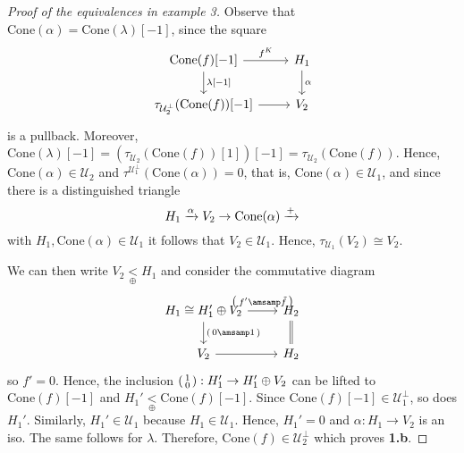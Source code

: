 \begin{proof}[Proof of the equivalences in example 3]
  Observe that $\mathrm{Cone}(\alpha)=\mathrm{Cone}(\lambda)[-1]$, since
  the square
  \begin{equation*}
    \begin{tikzcd}
      \mathrm{Cone}(f)[-1]\arrow{r}{f^K}\arrow{d}{\lambda[-1]}
        & H_1\arrow{d}{\alpha} \\
      \tau_{\mathcal{U}_2^\perp}(\mathrm{Cone}(f))[-1]\arrow{r}
        & V_2
    \end{tikzcd}
  \end{equation*}
  is a pullback. Moreover, $\mathrm{Cone}(\lambda)[-1] = (\tau_{\mathcal{U}_2}(\mathrm{Cone}(f))[1])[-1]
  =\tau_{\mathcal{U}_2}(\mathrm{Cone}(f))$. Hence, $\mathrm{Cone}(\alpha)\in \mathcal{U}_2$ and
  $\tau^{\mathcal{U}_1^\perp}(\mathrm{Cone}(\alpha))=0$, that is,
  $\mathrm{Cone}(\alpha)\in\mathcal{U}_1$, and since there is a distinguished triangle
  \begin{equation*}
    H_1\xrightarrow{\alpha} V_2\to \mathrm{Cone}(\alpha)\xrightarrow{+}
  \end{equation*}
  with $H_1,\mathrm{Cone}(\alpha)\in\mathcal{U}_1$ it follows that
  $V_2\in\mathcal{U}_1$. Hence, $\tau_{\mathcal{U}_1}(V_2)\cong V_2$.

  We can then write $V_2\underset{\oplus}{<}H_1$ and consider the commutative diagram
  \begin{equation*}
    \begin{tikzcd}
      H_1 \cong H_1'\oplus V_2\arrow{r}{
        \begin{psmallmatrix}
          f' \amsamp \tilde{f}
        \end{psmallmatrix}
      }\arrow{d}{
        \begin{psmallmatrix}
          0 \amsamp 1
        \end{psmallmatrix}
      }
        & H_2\arrow[equal]{d}\\
      V_2\arrow{r}
        & H_2
    \end{tikzcd}
  \end{equation*}
  so $f'=0$. Hence, the inclusion $
  \begin{psmallmatrix}
    1 \\ 0
  \end{psmallmatrix}:H_1'\to H_1'\oplus V_2$ can be lifted to
  $\mathrm{Cone}(f)[-1]$ and $H_1'\underset{\oplus}{<}\mathrm{Cone}(f)[-1]$.
  Since $\mathrm{Cone}(f)[-1]\in \mathcal{U}_1^\perp$, so does $H_1'$. Similarly,
  $H_1'\in\mathcal{U}_1$ because $H_1\in\mathcal{U}_1$. Hence, $H_1'=0$ and $\alpha:H_1\to V_2$ is an iso.
  The same follows for $\lambda$. Therefore, $\mathrm{Cone}(f)\in\mathcal{U}_2^\perp$ which
  proves \textbf{1.b}.
\end{proof}

